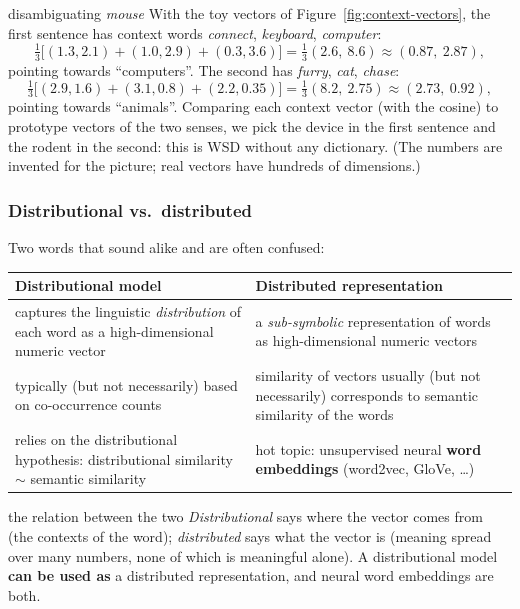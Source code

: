 \begin{nbexample}{disambiguating \emph{mouse}}
With the toy vectors of Figure~\ref{fig:context-vectors}, the first sentence has context
words \emph{connect}, \emph{keyboard}, \emph{computer}:
\[
  \tfrac{1}{3}\bigl[(1.3, 2.1) + (1.0, 2.9) + (0.3, 3.6)\bigr]
  = \tfrac{1}{3}(2.6,\ 8.6) \approx (0.87,\ 2.87),
\]
pointing towards ``computers''. The second has \emph{furry}, \emph{cat}, \emph{chase}:
\[
  \tfrac{1}{3}\bigl[(2.9, 1.6) + (3.1, 0.8) + (2.2, 0.35)\bigr]
  = \tfrac{1}{3}(8.2,\ 2.75) \approx (2.73,\ 0.92),
\]
pointing towards ``animals''. Comparing each context vector (with the cosine) to
prototype vectors of the two senses, we pick the device in the first sentence and the
rodent in the second: this is WSD without any dictionary. (The numbers are invented for
the picture; real vectors have hundreds of dimensions.)
\end{nbexample}

\subsubsection{Distributional vs.\ distributed}

Two words that sound alike and are often confused:

\begin{center}
\small
\begin{tabularx}{\linewidth}{@{}>{\raggedright\arraybackslash}X >{\raggedright\arraybackslash}X@{}}
\toprule
\textbf{Distributional model} & \textbf{Distributed representation} \\
\midrule
captures the linguistic \emph{distribution} of each word as a high-dimensional numeric
vector &
a \emph{sub-symbolic} representation of words as high-dimensional numeric vectors \\
typically (but not necessarily) based on co-occurrence counts &
similarity of vectors usually (but not necessarily) corresponds to semantic similarity
of the words \\
relies on the distributional hypothesis: distributional similarity $\sim$ semantic
similarity &
hot topic: unsupervised neural \textbf{word embeddings} (word2vec, GloVe, \ldots) \\
\bottomrule
\end{tabularx}
\end{center}

\begin{nbfact}{the relation between the two}
\emph{Distributional} says where the vector comes from (the contexts of the word);
\emph{distributed} says what the vector is (meaning spread over many numbers, none of
which is meaningful alone). A distributional model \textbf{can be used as} a distributed
representation, and neural word embeddings are both.
\end{nbfact}

